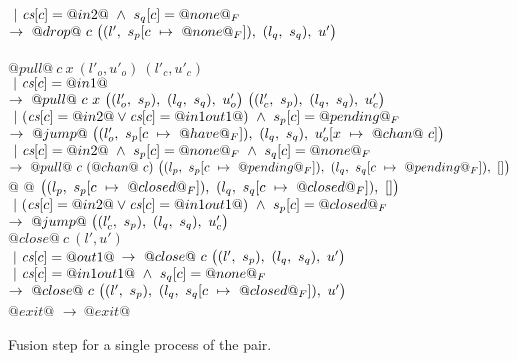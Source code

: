 \begin{figure*}
\begin{tabbing}
\> \> $~|~\cs[c]=@in2@ ~\wedge~ s_q[c]=@none@_F$
\> \hspace{2em} $\to~@drop@~c~
      \nextStep
        {l'}
          {\HeapUpdateOne{c}{@none@_F}{s_p}}
        {l_q}
          {s_q}
        {u'}
      $
\> 
\\[1ex]

\\



\> $@pull@~c~x~(l'_o,u'_o)~(l'_c,u'_c)$ \\
\> \> $~|~\cs[c]=@in1@$ 
\> $\to~@pull@~c~x~
      \nextStep
        {l'_o}{s_p}
        {l_q}{s_q}
        {u'_o}
      ~
      \nextStep
        {l'_c}{s_p}
        {l_q}{s_q}
        {u'_c}
    $ 
\> 
\\[1ex]

\> \> $~|~(\cs[c]=@in2@ \vee \cs[c]=@in1out1@) ~\wedge~ s_p[c]=@pending@_F$ \\
\> \> $\to~@jump@~
      \nextStep
        {l'_o}
          {\HeapUpdateOne{c}{@have@_F}{s_p}}
        {l_q}
          {s_q}
        {\HeapUpdateOne{x}{@chan@~c}{u'_o}}
        $ 
\> \>  
\\[1ex]

\> \> $~|~\cs[c]=@in2@ ~\wedge~ s_p[c]=@none@_F ~\wedge~ s_q[c]=@none@_F$ \\
\> \> $\to~@pull@~c~(@chan@~c)~
      \nextStep
        {l_p}
          {\HeapUpdateOne{c}{@pending@_F}{s_p}}
        {l_q}
          {\HeapUpdateOne{c}{@pending@_F}{s_q}}
        {[]}$
      \\
\> \> @                @
      $\nextStep
        {l_p}
          {\HeapUpdateOne{c}{@closed@_F}{s_p}}
        {l_q}
          {\HeapUpdateOne{c}{@closed@_F}{s_q}}
        {[]}
  $
\> \> 
\\[1ex]

\> \> $~|~(\cs[c]=@in2@ \vee \cs[c]=@in1out1@) ~\wedge~ s_p[c]=@closed@_F$ \\
\> \> $\to~@jump@~
      \nextStep
        {l'_c}{s_p}
        {l_q}{s_q}
        {u'_c}
  $
\> \> 
\\[1ex]

\> $@close@~c~(l',u')$ \\
\> \> $~|~\cs[c]=@out1@$ 
\> $\to~@close@~c~
      \nextStep
        {l'}{s_p}
        {l_q}{s_q}
        {u'}
    $ 
\> 
\\

\> \> $~|~\cs[c]=@in1out1@ ~\wedge~ s_q[c]=@none@_F$ 
\> $\to~@close@~c~
      \nextStep
        {l'}{s_p}
        {l_q}{\HeapUpdateOne{c}{@closed@_F}{s_q}}
        {u'}
    $ 
\> 
\\[1ex]

\> $@exit@$
\> 
\> $\to~@exit@$
\> 
\\


\end{tabbing}

\caption{Fusion step for a single process of the pair.} 

\label{fig:Finite:tryStep}
\end{figure*}

